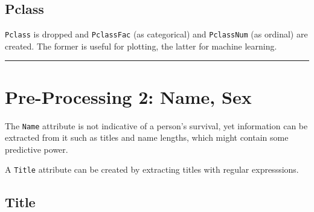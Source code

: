 \documentclass[]{article}
\newenvironment{Shaded}{\begin{snugshade}}{\end{snugshade}}
\newcommand{\KeywordTok}[1]{\textcolor[rgb]{0.13,0.29,0.53}{\textbf{#1}}}
\newcommand{\DecValTok}[1]{\textcolor[rgb]{0.00,0.00,0.81}{#1}}
\newcommand{\StringTok}[1]{\textcolor[rgb]{0.31,0.60,0.02}{#1}}
\newcommand{\CommentTok}[1]{\textcolor[rgb]{0.56,0.35,0.01}{\textit{#1}}}
\newcommand{\OtherTok}[1]{\textcolor[rgb]{0.56,0.35,0.01}{#1}}
\newcommand{\OperatorTok}[1]{\textcolor[rgb]{0.81,0.36,0.00}{\textbf{#1}}}
\newcommand{\NormalTok}[1]{#1}
\begin{document}
\subsection{Pclass}\label{pclass}

\texttt{Pclass} is dropped and \texttt{PclassFac} (as categorical) and
\texttt{PclassNum} (as ordinal) are created. The former is useful for
plotting, the latter for machine learning.

\begin{Shaded}
\end{Shaded}

\begin{center}\rule{0.5\linewidth}{\linethickness}\end{center}

\section{Pre-Processing 2: Name, Sex}\label{pre-processing-2-name-sex}

The \texttt{Name} attribute is not indicative of a person's survival,
yet information can be extracted from it such as titles and name
lengths, which might contain some predictive power.

A \texttt{Title} attribute can be created by extracting titles with
regular expresssions.

\subsection{Title}\label{title}
\end{document}
